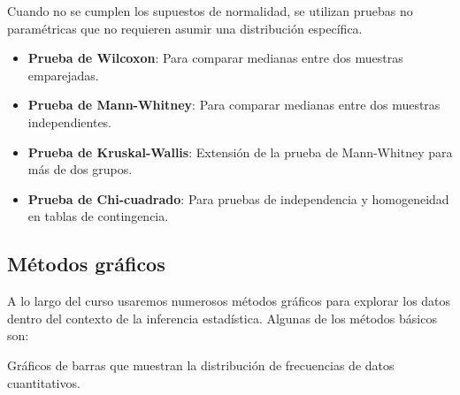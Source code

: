 \documentclass[
  letterpaper,
  DIV=11,
  numbers=noendperiod]{scrreprt}
\providecommand{\tightlist}{%
  \setlength{\itemsep}{0pt}\setlength{\parskip}{0pt}}\usepackage{longtable,booktabs,array}
\begin{document}
\begin{tcolorbox}[enhanced jigsaw, arc=.35mm, breakable, coltitle=black, left=2mm, opacityback=0, bottomtitle=1mm, colbacktitle=quarto-callout-note-color!10!white, title=\textcolor{quarto-callout-note-color}{\faInfo}\hspace{0.5em}{Pruebas no paramétricas}, titlerule=0mm, colback=white, colframe=quarto-callout-note-color-frame, bottomrule=.15mm, rightrule=.15mm, opacitybacktitle=0.6, toptitle=1mm, toprule=.15mm, leftrule=.75mm]

Cuando no se cumplen los supuestos de normalidad, se utilizan pruebas no
paramétricas que no requieren asumir una distribución específica.

\begin{itemize}
\tightlist
\item
  \textbf{Prueba de Wilcoxon}: Para comparar medianas entre dos muestras
  emparejadas.
\item
  \textbf{Prueba de Mann-Whitney}: Para comparar medianas entre dos
  muestras independientes.
\item
  \textbf{Prueba de Kruskal-Wallis}: Extensión de la prueba de
  Mann-Whitney para más de dos grupos.
\item
  \textbf{Prueba de Chi-cuadrado}: Para pruebas de independencia y
  homogeneidad en tablas de contingencia.
\end{itemize}

\end{tcolorbox}

\hypertarget{muxe9todos-gruxe1ficos}{%
\subsection{Métodos gráficos}\label{muxe9todos-gruxe1ficos}}

A lo largo del curso usaremos numerosos métodos gráficos para explorar
los datos dentro del contexto de la inferencia estadística. Algunas de
los métodos básicos son:

\begin{tcolorbox}[enhanced jigsaw, arc=.35mm, breakable, coltitle=black, left=2mm, opacityback=0, bottomtitle=1mm, colbacktitle=quarto-callout-note-color!10!white, title=\textcolor{quarto-callout-note-color}{\faInfo}\hspace{0.5em}{Histogramas}, titlerule=0mm, colback=white, colframe=quarto-callout-note-color-frame, bottomrule=.15mm, rightrule=.15mm, opacitybacktitle=0.6, toptitle=1mm, toprule=.15mm, leftrule=.75mm]

Gráficos de barras que muestran la distribución de frecuencias de datos
cuantitativos.

\end{tcolorbox}
\end{document}
